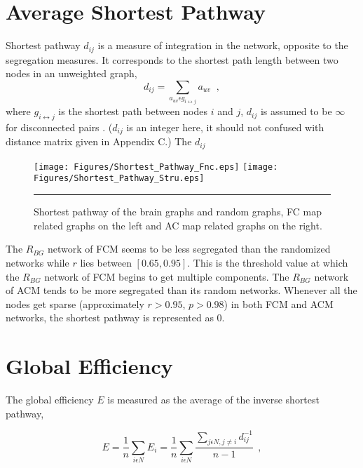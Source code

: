 \section{Average Shortest Pathway}
Shortest pathway $d_{ij}$ is a measure of integration in the network, opposite to the segregation measures. It corresponds to the shortest path length between two nodes in an unweighted graph,  
\begin{equation}
d_{ij} = \sum\limits_{a_{uv} \epsilon g_{i\leftrightarrow j} } a_{uv} \;\; ,
\end{equation}
where $g_{i\leftrightarrow j}$ is the shortest path between nodes $i$ and $j$, $d_{ij}$ is assumed to be $\infty$ for disconnected pairs \citep{RUB10}. ($d_{ij}$ is an integer here, it should not confused with distance matrix given in Appendix C.) The $d_{ij}$ 


\begin{figure}[htbp]
 
  \centering
	 \texttt{[image: Figures/Shortest\_Pathway\_Fnc.eps]}
	 \texttt{[image: Figures/Shortest\_Pathway\_Stru.eps]}
	\rule{35em}{0.5pt}  
  \caption[Shortest Pathway]{Shortest pathway of the brain graphs and random graphs, FC map related graphs on the left and AC map related graphs on the right.} 
    \label{fig:Shortest Pathway}
 	
\end{figure}  


The $R_{BG}$ network of FCM seems to be less segregated than the randomized networks while $r$ lies between $[0.65,0.95]$. This is the threshold value at which the $R_{BG}$ network of FCM begins to get multiple components. The $R_{BG}$ network of ACM tends to be more segregated than its random networks. Whenever all the nodes get sparse (approximately $r>0.95$, $p>0.98$) in both FCM and ACM networks, the shortest pathway is represented as 0. 




\section{Global Efficiency}
The global efficiency $E$ is measured as the average of the inverse shortest pathway,

\begin{equation}
E = \frac{1}{n}\sum\limits_{i \epsilon N} E_i = \frac{1}{n}\sum\limits_{i \epsilon N} \frac{\sum\limits_{j \epsilon N, j\neq i}d_{ij}^{-1}}{n-1 } \;\, ,
\end{equation}

